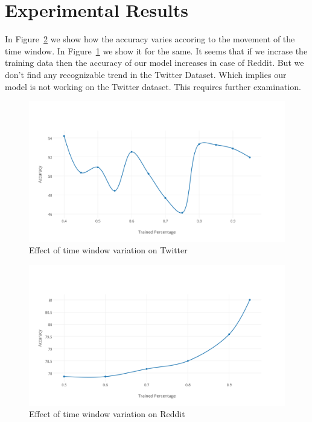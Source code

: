 \section*{Experimental Results}
In Figure~\ref{fig:Reddit_plot} we show how the accuracy varies accoring to the movement of the time window. In Figure~\ref{fig:Twitter_plot} we show it for the same. It seems that if we incrase the training data then the accuracy of our model increases in case of Reddit. But we don't find any recognizable trend in the Twitter Dataset. Which implies our model is not working on the Twitter dataset. This requires further examination.
\begin{figure}
\centering
\includegraphics[width=\textwidth,height=\textheight,keepaspectratio]{opinion_dynamics/images/Twitter_plot.png}
\caption{Effect of time window variation on Twitter}
\label{fig:Twitter_plot}
\end{figure}
\begin{figure}
\centering
\includegraphics[width=\textwidth,height=\textheight,keepaspectratio]{opinion_dynamics/images/Reddit_plot.png}
\caption{Effect of time window variation on Reddit}
\label{fig:Reddit_plot}
\end{figure}
